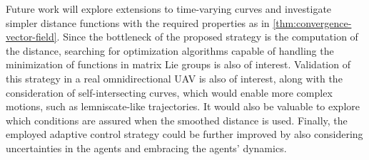Future work will explore extensions to time-varying curves and investigate simpler distance functions with the required properties as in \cref{thm:convergence-vector-field}. Since the bottleneck of the proposed strategy is the computation of the distance, searching for optimization algorithms capable of handling the minimization of functions in matrix Lie groups is also of interest. Validation of this strategy in a real omnidirectional UAV is also of interest, along with the consideration of self-intersecting curves, which would enable more complex motions, such as lemniscate-like trajectories. It would also be valuable to explore which conditions are assured when the smoothed distance is used. Finally, the employed adaptive control strategy could be further improved by also considering uncertainties in the agents and embracing the agents' dynamics.